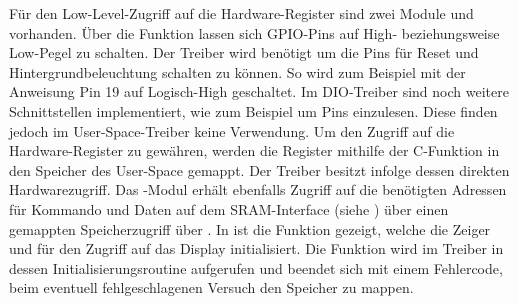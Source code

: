 Für den Low-Level-Zugriff auf die Hardware-Register sind zwei Module  und  vorhanden. Über die Funktion  lassen sich GPIO-Pins auf \linebreak High- beziehungsweise Low-Pegel zu schalten. Der Treiber wird benötigt um die Pins für Reset und Hintergrundbeleuchtung schalten zu können. So wird zum Beispiel mit der Anweisung  Pin 19 auf Logisch-High geschaltet.
Im DIO-Treiber sind noch weitere Schnittstellen implementiert, wie zum Beispiel  um Pins einzulesen. Diese finden jedoch im User-Space-Treiber keine Verwendung. Um den Zugriff auf die Hardware-Register zu gewähren, werden die Register mithilfe der C-Funktion  in den Speicher des User-Space gemappt. Der Treiber besitzt infolge dessen direkten Hardwarezugriff.
Das -Modul erhält ebenfalls Zugriff auf die benötigten Adressen für Kommando und Daten auf dem SRAM-Interface (siehe ) über einen gemappten Speicherzugriff über . In  ist die Funktion  gezeigt, welche die Zeiger  und  für den Zugriff auf das Display initialisiert. Die Funktion wird im Treiber in dessen Initialisierungsroutine aufgerufen und beendet sich mit einem Fehlercode, beim eventuell fehlgeschlagenen Versuch den Speicher zu mappen.

